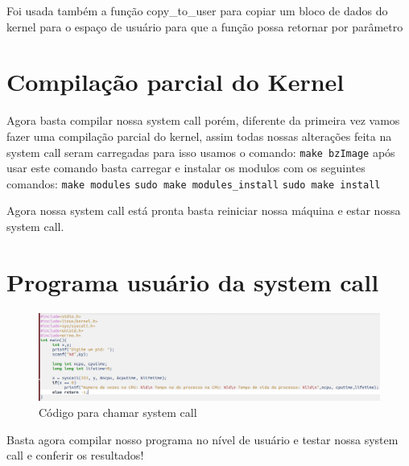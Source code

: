 \documentclass[12pt]{article}
\begin{document}
	Foi usada também a função copy\_to\_user para copiar um bloco de dados do kernel para o espaço de usuário para que a função possa retornar por parâmetro
 \pagebreak
 
\section{Compilação parcial do Kernel}
	Agora basta compilar nossa system call porém, diferente da primeira vez vamos fazer uma compilação parcial do kernel, assim todas nossas alterações feita na system call seram carregadas para isso usamos o comando: \newline
	\verb"make bzImage" \newline
após usar este comando basta carregar e instalar os modulos com os seguintes comandos:\newline
	\verb"make modules" \newline
	\verb"sudo make modules_install" \newline
	\verb"sudo make install" \newline
	
	Agora nossa system call está pronta basta reiniciar nossa máquina e estar nossa system call.
 
\section{Programa usuário da system call}
\begin{figure}[!htb]
\includegraphics[scale=0.37]{imagens/cod.png} 
	\caption{Código para chamar system call}
\end{figure}

	Basta agora compilar nosso programa no nível de usuário e testar nossa system call e conferir os resultados!
 \pagebreak



\end{document}
